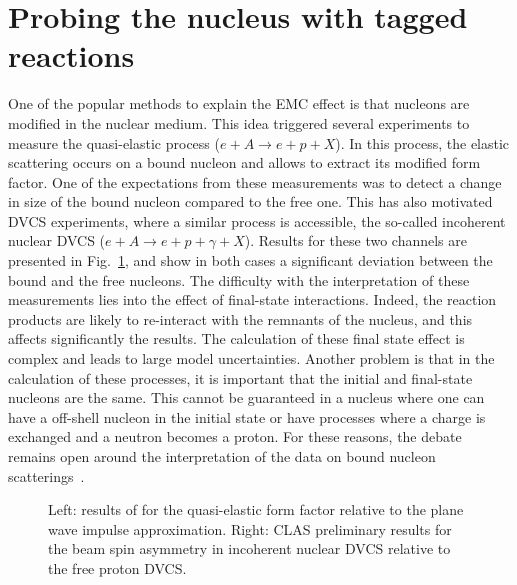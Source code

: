 \section{Probing the nucleus with tagged reactions} 

One of the popular methods to explain the EMC effect is that nucleons
are modified in the nuclear medium. This idea
triggered several experiments to measure the quasi-elastic 
process ($e+A \rightarrow e+p+X$). In this process, the 
elastic scattering occurs on a bound nucleon and allows to extract its modified 
form factor. One of the expectations from these measurements was to detect a change
in size of the bound nucleon compared to the free one. This has also motivated 
DVCS experiments, where a similar process is accessible, the so-called
incoherent nuclear DVCS ($e+A \rightarrow e+p+\gamma+X$). Results for these two 
channels are presented in Fig.~\ref{fig:QEincoh}, and show in both cases a 
significant deviation between the bound and the free nucleons. 
The difficulty with the interpretation of these measurements lies into the 
effect of final-state interactions. Indeed, the reaction products are likely
to re-interact with the remnants of the nucleus, and this affects significantly the
results. The calculation of these final state effect is complex and leads to large model 
uncertainties. 
Another problem is that in the calculation of these processes, it is important
that the initial and final-state nucleons are the same. This cannot be guaranteed
in a nucleus where one can have a off-shell nucleon in the initial state or 
have processes where a charge is exchanged and a neutron becomes a proton. For
these reasons, the debate remains open around 
the interpretation of the data on bound nucleon scatterings~\cite{Benhar:2006wy}.

\begin{figure}[tbp!]
\center
\caption{Left: results of \cite{Strauch:2002wu} for the quasi-elastic form factor relative to
the plane wave impulse approximation. Right: CLAS preliminary results 
for the beam spin asymmetry in incoherent nuclear DVCS relative to the free proton DVCS.}
\label{fig:QEincoh}
\end{figure}

